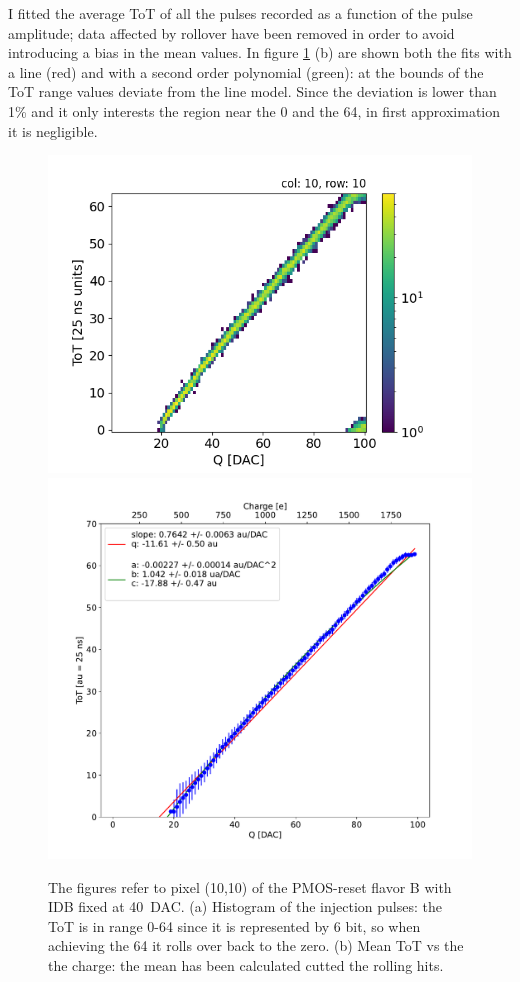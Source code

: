         I fitted the average ToT of all the pulses recorded as a function of the pulse amplitude; data affected by rollover have been removed in order to avoid introducing a bias in the mean values.
        In figure \ref{fig:ToT_vs_charge} (b) are shown both the fits with a line (red) and with a second order polynomial (green): at the bounds of the ToT range values deviate from the line model. Since the deviation is lower than 1\% and it only interests the region near the 0 and the 64, in first approximation it is negligible. 
        
        \begin{figure}[h!]
            \centering
            \includegraphics[width=.49\linewidth]{figures/charaterization/ToT_rollover.png}            
            \includegraphics[width=.49\linewidth]{figures/charaterization/ToT_injection.pdf}
            \caption{The figures refer to pixel (10,10) of the PMOS-reset flavor B with IDB fixed at \SI{40}{DAC}.
            (a) Histogram of the injection pulses: the ToT is in range 0-64 since it is represented by 6 bit, so when achieving the 64 it rolls over back to the zero. (b) Mean ToT vs the the charge: the mean has been calculated cutted the rolling hits. }
            \label{fig:ToT_vs_charge}
        \end{figure}    

